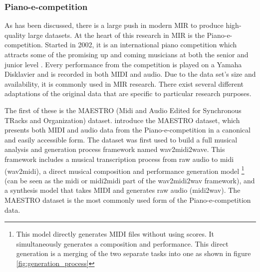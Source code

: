 \subsubsection{Piano-e-competition}
As has been discussed, there is a large push in modern MIR to produce high-quality large datasets. At the heart of this research in MIR is the Piano-e-competition. Started in 2002, it is an international piano competition which attracts some of the promising up and coming musicians at both the senior and junior level \cite{the-disklavier-education-network}. Every performance from the competition is played on a Yamaha Disklavier and is recorded in both MIDI and audio. Due to the data set's size and availability, it is commonly used in MIR research. There exist several different adaptations of the original data that are specific to particular research purposes. 

The first of these is the MAESTRO (Midi and Audio Edited for Synchronous TRacks and Organization) dataset. \citet{hawthorne2018enabling} introduce the MAESTRO dataset, which presents both MIDI and audio data from the Piano-e-competition in a canonical and easily accessible form. The dataset was first used to build a full musical analysis and generation process framework named wav2midi2wave. This framework includes a musical transcription process \cite{hawthorne2017onsets} from raw audio to midi (wav2midi), a direct musical composition and performance generation model \cite{huang2018music} \footnote{This model directly generates MIDI files without using scores. It simultaneously generates a composition and performance. This direct generation is a merging of the two separate tasks into one as shown in figure \ref{fig:generation_process}} (can be seen as the midi or midi2midi part of the wav2midi2wav framework), and a synthesis model that takes MIDI and generates raw audio\cite{oord2016wavenet} (midi2wav). The MAESTRO dataset is the most commonly used form of the Piano-e-competition data. 

